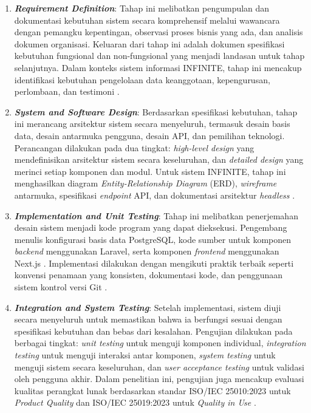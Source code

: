 \begin{enumerate}
  \item \textbf{\textit{Requirement Definition}}: Tahap ini melibatkan pengumpulan dan dokumentasi kebutuhan sistem secara komprehensif melalui wawancara dengan pemangku kepentingan, observasi proses bisnis yang ada, dan analisis dokumen organisasi. Keluaran dari tahap ini adalah dokumen spesifikasi kebutuhan fungsional dan non-fungsional yang menjadi landasan untuk tahap selanjutnya. Dalam konteks sistem informasi INFINITE, tahap ini mencakup identifikasi kebutuhan pengelolaan data keanggotaan, kepengurusan, perlombaan, dan testimoni \citep{Nuseibeh_2000_Requirements}.

  \item \textbf{\textit{System and Software Design}}: Berdasarkan spesifikasi kebutuhan, tahap ini merancang arsitektur sistem secara menyeluruh, termasuk desain basis data, desain antarmuka pengguna, desain API, dan pemilihan teknologi. Perancangan dilakukan pada dua tingkat: \textit{high-level design} yang mendefinisikan arsitektur sistem secara keseluruhan, dan \textit{detailed design} yang merinci setiap komponen dan modul. Untuk sistem INFINITE, tahap ini menghasilkan diagram \textit{Entity-Relationship Diagram} (ERD), \textit{wireframe} antarmuka, spesifikasi \textit{endpoint} API, dan dokumentasi arsitektur \textit{headless} \citep{Bass_2017_SoftwareArchitecture}.

  \item \textbf{\textit{Implementation and Unit Testing}}: Tahap ini melibatkan penerjemahan desain sistem menjadi kode program yang dapat dieksekusi. Pengembang menulis konfigurasi basis data PostgreSQL, kode sumber untuk komponen \textit{backend} menggunakan Laravel, serta komponen \textit{frontend} menggunakan Next.js . Implementasi dilakukan dengan mengikuti praktik terbaik seperti konvensi penamaan yang konsisten, dokumentasi kode, dan penggunaan sistem kontrol versi Git \citep{Foucault_2019_CodingPractices}.

  \item \textbf{\textit{Integration and System Testing}}: Setelah implementasi, sistem diuji secara menyeluruh untuk memastikan bahwa ia berfungsi sesuai dengan spesifikasi kebutuhan dan bebas dari kesalahan. Pengujian dilakukan pada berbagai tingkat: \textit{unit testing} untuk menguji komponen individual, \textit{integration testing} untuk menguji interaksi antar komponen, \textit{system testing} untuk menguji sistem secara keseluruhan, dan \textit{user acceptance testing} untuk validasi oleh pengguna akhir. Dalam penelitian ini, pengujian juga mencakup evaluasi kualitas perangkat lunak berdasarkan standar ISO/IEC 25010:2023 untuk \textit{Product Quality} dan ISO/IEC 25019:2023 untuk \textit{Quality in Use} \citep{Alyahya_2020_CrowdsourcedTestingSLR}.


\end{enumerate}
